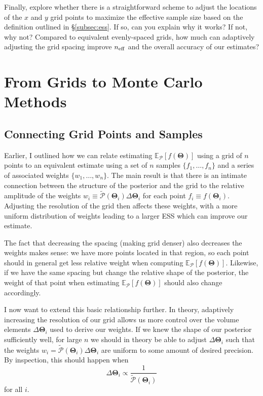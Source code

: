 \documentclass[12pt, titlepage]{article}
\newcommand{\meanwrt}[2]{\ensuremath{\mathbb{E}_{{#2}}\left[{#1}\right]}}
\newcommand{\params}{\ensuremath{\boldsymbol\Theta}}
\newcommand{\posterior}{\ensuremath{\mathcal{P}}}
\begin{document}
Finally, explore whether there is a straightforward scheme to adjust the
locations of the $x$ and $y$ grid points to maximize the effective
sample size based on the definition outlined in \S\ref{subsec:ess}.
If so, can you explain why it works? If not, why not?
Compared to equivalent evenly-spaced grids, how much can adaptively adjusting
the grid spacing improve $n_{\rm eff}$ and the overall accuracy of our estimates?

\section{From Grids to Monte Carlo Methods} \label{sec:montecarlo}

\subsection{Connecting Grid Points and Samples}
\label{subsec:grid_to_samp}

Earlier, I outlined how we can relate estimating
$\meanwrt{f(\params)}{\posterior}$ using a grid of $n$ points to
an equivalent estimate using a set of $n$ samples $\{ f_1, \dots, f_n\}$
and a series of associated weights $\{ w_1, \dots, w_n \}$.
The main result is that there is an intimate connection between the
structure of the posterior and the grid to the relative amplitude
of the weights $w_i \equiv \tilde{\posterior}(\params_i)\Delta\params_i$
for each point $f_i \equiv f(\params_i)$. Adjusting the resolution
of the grid then affects these weights, with a more uniform distribution
of weights leading to a larger ESS which can improve our estimate.

The fact that decreasing the spacing (making grid denser)
also decreases the weights makes sense: we have more points 
located in that region, so each point should in general
get less relative weight when computing $\meanwrt{f(\params)}{\posterior}$. 
Likewise, if we have the same spacing
but change the relative shape of the posterior, 
the weight of that point when estimating $\meanwrt{f(\params)}{\posterior}$
should also change accordingly.

I now want to extend this basic relationship further.
In theory, adaptively increasing the resolution of our grid allows
us more control over the volume elements $\Delta \params_i$ used to
derive our weights. If we knew the shape of our posterior sufficiently
well, for large $n$ 
we should in theory be able to adjust $\Delta \params_i$ such that
the weights $w_i = \tilde{\posterior}(\params_i)\Delta\params_i$
are uniform to some amount of desired precision.
By inspection, this should happen when
\begin{equation}
    \Delta \params_i \propto \frac{1}{\tilde{\posterior}(\params_i)}
\end{equation}
for all $i$.
\end{document}
